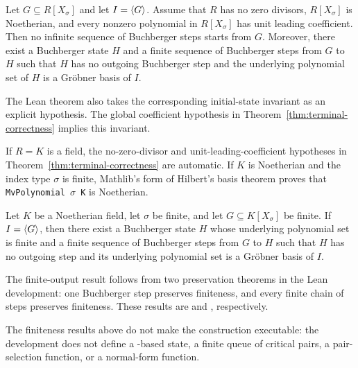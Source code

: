 \begin{theorem}
\label{thm:terminal-correctness}
Let $G\subseteq R[X_\sigma]$ and let $I=\langle G \rangle$.  Assume that $R$ has no
zero divisors, $R[X_\sigma]$ is Noetherian, and every nonzero polynomial in
$R[X_\sigma]$ has unit leading coefficient.  Then no infinite sequence of
Buchberger steps starts from $G$.  Moreover, there exist a Buchberger state
$H$ and a finite sequence of Buchberger steps from $G$ to $H$ such that $H$
has no outgoing Buchberger step and the underlying polynomial set of $H$ is a
Gr\"obner basis of $I$.
\end{theorem}

The Lean theorem also takes the corresponding initial-state invariant as an
explicit hypothesis.  The global coefficient hypothesis in
Theorem~\ref{thm:terminal-correctness} implies this invariant.

If $R=K$ is a field, the no-zero-divisor and unit-leading-coefficient
hypotheses in Theorem~\ref{thm:terminal-correctness} are automatic.  If $K$ is
Noetherian and the index type $\sigma$ is finite, Mathlib's form of
Hilbert's basis theorem proves that \texttt{MvPolynomial }\(\sigma\)\texttt{ K} is Noetherian.

\begin{corollary}
\label{cor:finite-terminal}
Let $K$ be a Noetherian field, let $\sigma$ be finite, and let
$G\subseteq K[X_\sigma]$ be finite.  If $I=\langle G \rangle$, then there exist a
Buchberger state $H$ whose underlying polynomial set is finite and a finite sequence of Buchberger steps from $G$
to $H$ such that $H$ has no outgoing step and its underlying polynomial set is
a Gr\"obner basis of $I$.
\end{corollary}

The finite-output result follows from two preservation theorems in the Lean
development: one Buchberger step preserves finiteness, and every finite chain
of steps preserves finiteness.  These results are
and
,
respectively.

\begin{remark}\label{rem:not-executable}
The finiteness results above do not make the construction executable: the
development does not define a -based state, a finite queue of
critical pairs, a pair-selection function, or a normal-form function.
\end{remark}
